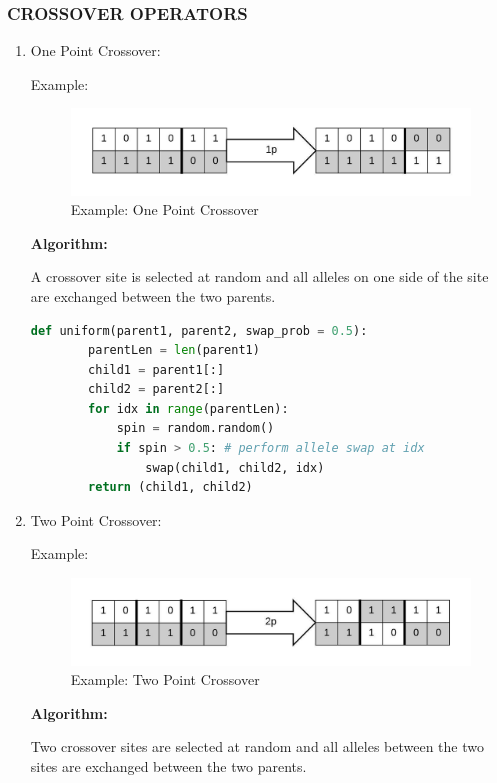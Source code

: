 \documentclass[12pt,a4paper]{article}
\begin{document}
	\subsubsection{CROSSOVER OPERATORS}
	\begin{enumerate}

	\item One Point Crossover: \par
	
	Example:
	\begin{figure}[h]
		\includegraphics[width=\textwidth]{xover-1p}
		\caption{Example: One Point Crossover}
		\centering
	\end{figure}
	
	\textbf{Algorithm:} \par
	A crossover site is selected at random and all alleles on one side of the site are exchanged between the two parents.
	\begin{lstlisting}[language=Python]
    def uniform(parent1, parent2, swap_prob = 0.5):
        parentLen = len(parent1)
        child1 = parent1[:]
        child2 = parent2[:]
        for idx in range(parentLen):
            spin = random.random()
            if spin > 0.5: # perform allele swap at idx
                swap(child1, child2, idx)
        return (child1, child2)
	\end{lstlisting}

	\item Two Point Crossover: \par
	Example:
	\begin{figure}[h]
		\includegraphics[width=\textwidth]{xover-2p}
		\caption{Example: Two Point Crossover}
		\centering
	\end{figure}
	
	\textbf{Algorithm:} \par
	Two crossover sites are selected at random and all alleles between the two sites are exchanged between the two parents.	
	

\end{enumerate}
\end{document}
